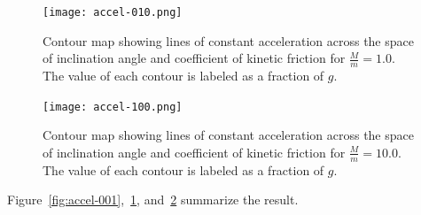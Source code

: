 \documentclass[twocolumn]{article}
\begin{document}
\begin{figure}
   \texttt{[image: accel-010.png]}
   \caption{Contour map showing lines of constant acceleration across the space
   of inclination angle and coefficient of kinetic friction for $\tfrac{M}{m} =
   1.0$. The value of each contour is labeled as a fraction of $g$.}
   \label{fig:accel-010}
\end{figure}

\begin{figure}
   \texttt{[image: accel-100.png]}
   \caption{Contour map showing lines of constant acceleration across the space
   of inclination angle and coefficient of kinetic friction for $\tfrac{M}{m} =
   10.0$. The value of each contour is labeled as a fraction of $g$.}
   \label{fig:accel-100}
\end{figure}

Figure~\ref{fig:accel-001},~\ref{fig:accel-010}, and~\ref{fig:accel-100}
summarize the result.
\end{document}
